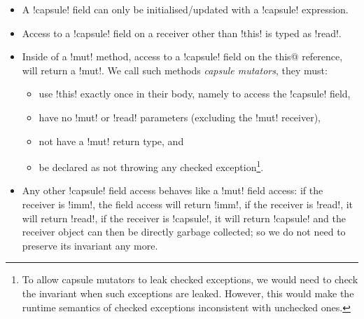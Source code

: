 \SSI\begin{itemize}
	\item A \Q!capsule! field can only be initialised/updated with a \Q!capsule! expression.
\item Access to a \Q!capsule! field on a receiver other than \Q!this! is typed as \Q!read!.
\item 
Inside of a \Q!mut! method,
access to a \Q!capsule! field 
on the \Q@mut this@ reference, will return a \Q!mut!.
We call such methods \emph{capsule mutators}, they must:
\begin{itemize}
		\item use \Q!this! exactly once in their body, namely to access the \Q!capsule! field,
		\item have no \Q!mut! or \Q!read! parameters (excluding the \Q!mut! receiver),
		\item not have a \Q!mut! return type, and
		\item be declared as not throwing any checked exception\footnote{To allow capsule mutators to leak checked exceptions, we would need to check the invariant when such exceptions are leaked. However, this would make the runtime semantics of checked exceptions inconsistent with unchecked ones.}.
	\end{itemize}	
	\item Any other \Q!capsule! field access behaves like a \Q!mut! field access: if the receiver is \Q!imm!, the field access will return \Q!imm!, if the receiver is \Q!read!, it will return \Q!read!, if the receiver is \Q!capsule!, it will return \Q!capsule! and
the \Q@capsule@ receiver object can then be directly garbage collected; so we do not need to preserve its invariant any more. %
	
\end{itemize}

